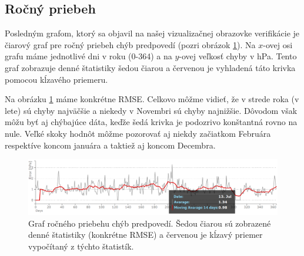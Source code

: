 \subsection{Ročný priebeh}
Posledným grafom, ktorý sa objavil na našej vizualizačnej obrazovke verifikácie je čiarový graf pre ročný priebeh chýb predpovedí (pozri obrázok \ref{fig:progress}). Na \mbox{$ x $-ovej} osi grafu máme jednotlivé dni v roku (0-364) a na \mbox{$ y $-ovej} veľkosť chyby v hPa. Tento graf zobrazuje denné štatistiky šedou čiarou a červenou je vyhladená táto krivka pomocou kĺzavého priemeru.

Na obrázku \ref{fig:progress} máme konkrétne RMSE. Celkovo môžme vidieť, že v strede roka (v lete) sú chyby najväčšie a niekedy v Novembri sú chyby najnižšie. Dôvodom však môžu byť aj chýbajúce dáta, keďže šedá krivka je podozrivo konštantná rovno na nule. Veľké skoky hodnôt môžme pozorovať aj niekdy začiatkom Februára respektíve koncom januára a taktiež aj koncom Decembra.


\begin{figure}
	\centering
	\includegraphics[width = 6in]{progress}
	\caption{Graf ročného priebehu chýb predpovedí. Šedou čiarou sú zobrazené denné štatistiky (konkrétne RMSE) a červenou je kĺzavý priemer vypočítaný z týchto štatistík. }
	\label{fig:progress} 
\end{figure}